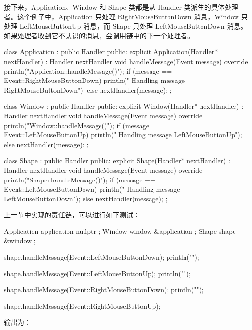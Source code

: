 接下来，Application、Window 和 Shape 类都是从 Handler 类派生的具体处理者。这个例子中，Application 只处理 RightMouseButtonDown 消息，Window 只处理 LeftMouseButtonUp 消息，而 Shape 只处理 LeftMouseButtonDown 消息。如果处理者收到它不认识的消息，会调用链中的下一个处理者。

\begin{cpp}
class Application : public Handler
{
    public:
        explicit Application(Handler* nextHandler) : Handler { nextHandler } { }
        void handleMessage(Event message) override
        {
            println("Application::handleMessage()");
            if (message == Event::RightMouseButtonDown) {
                println(" Handling message RightMouseButtonDown");
            } else { nextHandler(message); }
        }
};

class Window : public Handler
{
    public:
        explicit Window(Handler* nextHandler) : Handler { nextHandler } { }
        void handleMessage(Event message) override
        {
            println("Window::handleMessage()");
            if (message == Event::LeftMouseButtonUp) {
                println(" Handling message LeftMouseButtonUp");
            } else { nextHandler(message); }
        }
};

class Shape : public Handler
{
    public:
        explicit Shape(Handler* nextHandler) : Handler { nextHandler } { }
        void handleMessage(Event message) override
        {
            println("Shape::handleMessage()");
            if (message == Event::LeftMouseButtonDown) {
                println(" Handling message LeftMouseButtonDown");
            } else { nextHandler(message); }
        }
};
\end{cpp}


上一节中实现的责任链，可以进行如下测试：

\begin{cpp}
Application application { nullptr };
Window window { &application };
Shape shape { &window };

shape.handleMessage(Event::LeftMouseButtonDown);
println("");

shape.handleMessage(Event::LeftMouseButtonUp);
println("");

shape.handleMessage(Event::RightMouseButtonDown);
println("");

shape.handleMessage(Event::RightMouseButtonUp);
\end{cpp}

输出为：

